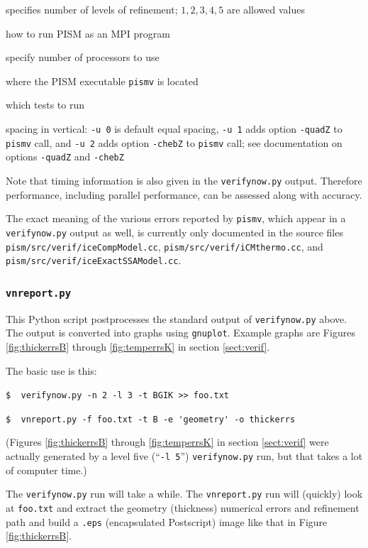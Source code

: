 \documentclass[11pt,final]{amsart}
\begin{document}
 specifies number of levels of refinement; $1,2,3,4,5$ are allowed values

 how to run PISM as an MPI program

 specify number of processors to use

 where the PISM executable \verb|pismv| is located

 which tests to run

 spacing in vertical: \verb|-u 0| is default equal spacing, \verb|-u 1| adds option \verb|-quadZ| to \verb|pismv| call, and \verb|-u 2| adds option \verb|-chebZ| to \verb|pismv| call; see documentation on options \verb|-quadZ| and  \verb|-chebZ|

\medskip
Note that timing information is also given in the \verb|verifynow.py| output.  Therefore performance, including parallel performance, can be assessed along with accuracy.

The exact meaning of the various errors reported by \verb|pismv|, which appear in a \verb|verifynow.py| output as well, is currently only documented in the source files \verb|pism/src/verif/iceCompModel.cc|, \verb|pism/src/verif/iCMthermo.cc|, and \verb|pism/src/verif/iceExactSSAModel.cc|.  


\subsubsection*{\Large{\texttt{vnreport.py}}}  This Python script postprocesses the standard output of \verb|verifynow.py| above.  The output is converted into graphs using \verb|gnuplot|.  Example graphs are Figures \ref{fig:thickerrsB} through \ref{fig:temperrsK} in section \ref{sect:verif}.

The basic use is this:

\verb|$  verifynow.py -n 2 -l 3 -t BGIK >> foo.txt|

\verb|$  vnreport.py -f foo.txt -t B -e 'geometry' -o thickerrs|

\noindent (Figures \ref{fig:thickerrsB} through \ref{fig:temperrsK} in section \ref{sect:verif} were actually generated by a level five (``\verb|-l 5|'') \verb|verifynow.py| run, but that takes a lot of computer time.)

The \verb|verifynow.py| run will take a while.  The \verb|vnreport.py| run will (quickly) look at \verb|foo.txt| and extract the geometry (thickness) numerical errors and refinement path and build a \verb|.eps| (encapsulated Postscript) image like that in Figure \ref{fig:thickerrsB}.
\end{document}
